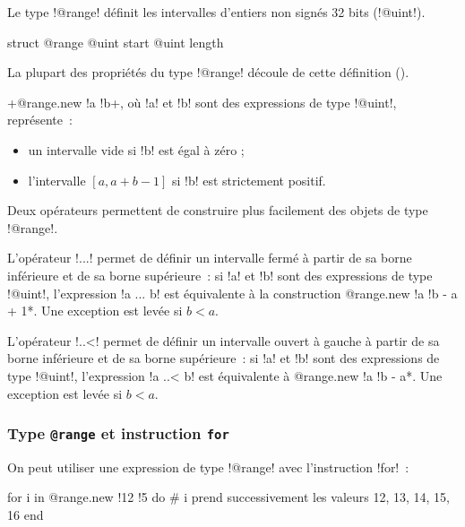 Le type \ggst!@range! définit les intervalles d'entiers non signés 32 bits (\ggst!@uint!).

\begin{galgas3}
struct @range {
  @uint start
  @uint length
}
\end{galgas3}

La plupart des propriétés du type \ggst!@range! découle de cette définition ().

\ggst+@range.new {!a !b}+, où \ggst!a! et \ggst!b! sont des expressions de type \ggst!@uint!, représente~:
\begin{itemize}
  \item un intervalle vide si \ggst!b! est égal à zéro ;
  \item l'intervalle $[a, a+b-1]$ si \ggst!b! est strictement positif.
\end{itemize}




Deux opérateurs permettent de construire plus facilement des objets de type \ggst!@range!.

L'opérateur \ggst!...! permet de définir un intervalle fermé à partir de sa borne inférieure et de sa borne supérieure~: si \ggst!a! et \ggst!b! sont des expressions de type \ggst!@uint!, l'expression \ggst!a ... b! est équivalente à la construction \ggst*@range.new {!a !b - a + 1}*. Une exception est levée si $b < a$.

L'opérateur \ggst!..<! permet de définir un intervalle ouvert à gauche à partir de sa borne inférieure et de sa borne supérieure~: si \ggst!a! et \ggst!b! sont des expressions de type \ggst!@uint!, l'expression \ggst!a ..< b! est équivalente à \ggst*@range.new {!a !b - a}*. Une exception est levée si $b < a$.

\subsubsection{Type \texttt{@range} et instruction \texttt{for}}

On peut utiliser une expression de type \ggst!@range! avec l'instruction \ggst!for!~:

\begin{galgas3}
for i in @range.new {!12 !5} do
  # i prend successivement les valeurs 12, 13, 14, 15, 16
end
\end{galgas3}

